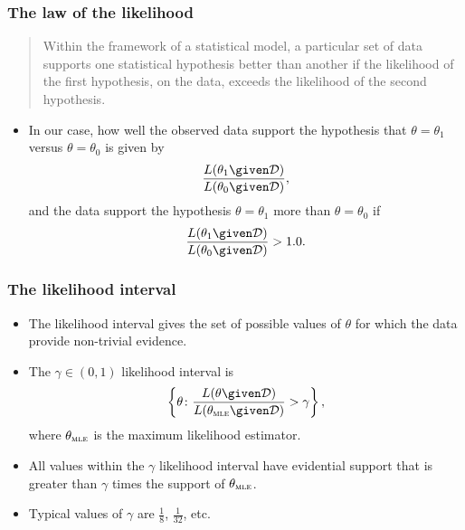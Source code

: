 \documentclass{slides}
\begin{document}
\begin{frame}
	\frametitle{The law of the likelihood}
\begin{quotation}
	Within the framework of a statistical model,  a
particular set of data supports one statistical
hypothesis better than another if the likelihood of
the first hypothesis, on the data, exceeds the
likelihood of the second hypothesis.
\end{quotation}
\vspace{-\baselineskip}
\vspace{0.5\baselineskip}
	\begin{itemize}
		\item In our case, how well the observed data support the hypothesis that $\theta = \theta_1$ versus $\theta = \theta_0$ is given by
			\[
				\frac{L(\theta_1\given \mathcal{D})}{L(\theta_0\given \mathcal{D})},
				\]
			and the data support the hypothesis $\theta = \theta_1$ more than $\theta = \theta_0$ if
		\[
				\frac{L(\theta_1\given \mathcal{D})}{L(\theta_0\given \mathcal{D})} > 1.0.
				\]
	\end{itemize}
\end{frame}

\begin{frame}
	\frametitle{The likelihood interval}
	\begin{itemize}
		\item The likelihood interval gives the set of possible values of $\theta$ for which the data provide non-trivial evidence.
		\item The $\gamma \in (0, 1)$ likelihood interval is  
		\[
			\left\{	\theta \colon \frac{L(\theta\given \mathcal{D})}{L(\theta_{\textsc{mle}}\given \mathcal{D})} > \gamma \right\},
				\]
			where $\theta_{\textsc{mle}}$ is the maximum likelihood estimator.
		\item All values within the $\gamma$ likelihood interval have evidential support that is greater than $\gamma$ times the support of $\theta_{\textsc{mle}}$.
		\item Typical values of $\gamma$ are $\tfrac{1}{8}$, $\tfrac{1}{32}$, etc.
	\end{itemize}
\end{frame}
\end{document}
